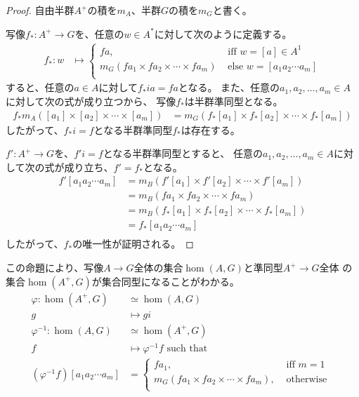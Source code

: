	\begin{proof}
		自由半群$A^+$の積を$m_A$、半群$G$の積を$m_G$と書く。
		
		写像$f_*:A^+\to G$を、任意の$w\in A^*$に対して次のように定義する。
		\begin{equation*}\begin{split}
			f_*: w &\mapsto \begin{cases}
				fa, &\text{ iff }w = [a] \in A^1 \\
				m_G(fa_1\times fa_2\times \cdots \times fa_m)
					&\text{ else }w = [a_1a_2\cdots a_m] \\
				\end{cases}
		\end{split}\end{equation*}
		すると、任意の$a\in A$に対して$f_*ia=fa$となる。
		また、任意の$a_1,a_2,\dots,a_m\in A$に対して次の式が成り立つから、
		写像$f_*$は半群準同型となる。
		\begin{equation*}\begin{split}
			f_*m_A([a_1] \times [a_2] \times \cdots \times [a_m])
				&= m_G(f_*[a_1]\times f_*[a_2]\times \cdots \times f_*[a_m]) 
		\end{split}\end{equation*}
		したがって、$f_*i=f$となる半群準同型$f_*$は存在する。

		$f':A^+\to G$を、$f'i=f$となる半群準同型とすると、
		任意の$a_1,a_2,\dots,a_m\in A$に対して次の式が成り立ち、$f'=f_*$となる。
		\begin{equation*}\begin{split}
			f'[a_1a_2\cdots a_m] &= m_B(f'[a_1]\times f'[a_2]\times \cdots \times f'[a_m]) \\
				&= m_B(fa_1\times fa_2\times \cdots \times fa_m) \\
				&= m_B(f_*[a_1]\times f_*[a_2]\times \cdots \times f_*[a_m]) \\
				&= f_*[a_1a_2\cdots a_m] \\
		\end{split}\end{equation*}
		したがって、$f_*$の唯一性が証明される。
	\end{proof}

	この命題により、写像$A\to G$全体の集合$\hom(A,G)$と準同型$A^+\to G$全体
	の集合$\hom(A^+,G)$が集合同型になることがわかる。
	\begin{equation}\begin{split} %
		\varphi: \hom(A^+,G) &\simeq \hom(A,G) \\
			g &\mapsto gi \\
		\varphi^{-1}: \hom(A,G) &\simeq \hom(A^+,G) \\
			f &\mapsto \varphi^{-1}f \text{ such that } \\
			(\varphi^{-1}f)[a_1a_2\cdots a_m] &= \begin{cases}
				fa_1, &\text{ iff } m=1 \\
				m_G(fa_1\times fa_2\times \cdots\times fa_m), &\text{ otherwise } \\
				\end{cases}
	\end{split}\end{equation} %

